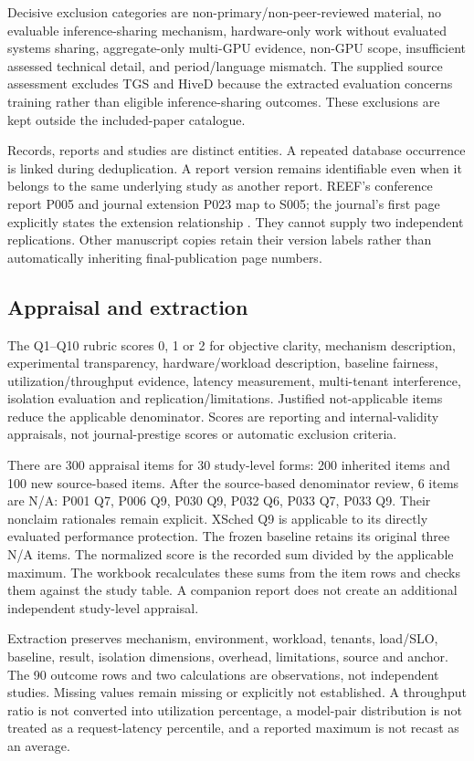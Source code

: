 Decisive exclusion categories are non-primary/non-peer-reviewed material, no evaluable inference-sharing mechanism, hardware-only work without evaluated systems sharing, aggregate-only multi-GPU evidence, non-GPU scope, insufficient assessed technical detail, and period/language mismatch. The supplied source assessment excludes TGS and HiveD because the extracted evaluation concerns training rather than eligible inference-sharing outcomes. These exclusions are kept outside the included-paper catalogue.

Records, reports and studies are distinct entities. A repeated database occurrence is linked during deduplication. A report version remains identifiable even when it belongs to the same underlying study as another report. REEF's conference report P005 and journal extension P023 map to S005; the journal's first page explicitly states the extension relationship \cite{P005,P023}. They cannot supply two independent replications. Other manuscript copies retain their version labels rather than automatically inheriting final-publication page numbers.

\subsection{Appraisal and extraction}
The Q1--Q10 rubric scores 0, 1 or 2 for objective clarity, mechanism description, experimental transparency, hardware/workload description, baseline fairness, utilization/throughput evidence, latency measurement, multi-tenant interference, isolation evaluation and replication/limitations. Justified not-applicable items reduce the applicable denominator. Scores are reporting and internal-validity appraisals, not journal-prestige scores or automatic exclusion criteria.

There are 300 appraisal items for 30 study-level forms: 200 inherited items and 100 new source-based items. After the source-based denominator review, 6 items are N/A: P001 Q7, P006 Q9, P030 Q9, P032 Q6, P033 Q7, P033 Q9. Their nonclaim rationales remain explicit. XSched Q9 is applicable to its directly evaluated performance protection. The frozen baseline retains its original three N/A items. The normalized score is the recorded sum divided by the applicable maximum. The workbook recalculates these sums from the item rows and checks them against the study table. A companion report does not create an additional independent study-level appraisal.

Extraction preserves mechanism, environment, workload, tenants, load/SLO, baseline, result, isolation dimensions, overhead, limitations, source and anchor. The 90 outcome rows and two calculations are observations, not independent studies. Missing values remain missing or explicitly not established. A throughput ratio is not converted into utilization percentage, a model-pair distribution is not treated as a request-latency percentile, and a reported maximum is not recast as an average.


